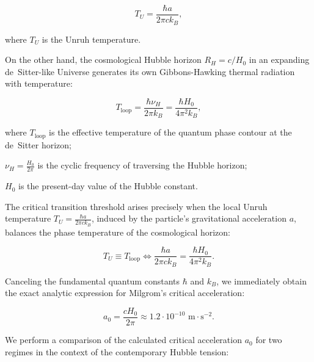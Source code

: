 \begin{equation}\label{eq:4.3}\tag{4.3}
T_U = \frac{\hbar a}{2\pi c k_B},
\end{equation}

where $T_U$ is the Unruh temperature.

On the other hand, the cosmological Hubble horizon $R_H = c/H_0$ in an expanding de~Sitter-like Universe generates its own Gibbons-Hawking thermal radiation \cite{ref25} with temperature:

\begin{equation}\label{eq:4.4}\tag{4.4}
T_{\text{loop}} = \frac{\hbar \nu_H}{2\pi k_B} = \frac{\hbar H_0}{4\pi^2 k_B},
\end{equation}

where $T_{\text{loop}}$ is the effective temperature of the quantum phase contour at the de~Sitter horizon;  

$\nu_H = \frac{H_0}{2\pi}$ is the cyclic frequency of traversing the Hubble horizon;  

$H_0$ is the present-day value of the Hubble constant.

The critical transition threshold arises precisely when the local Unruh temperature $T_U = \frac{\hbar a}{2\pi c k_B}$, induced by the particle's gravitational acceleration $a$, balances the phase temperature of the cosmological horizon:

\begin{equation}\label{eq:4.5}\tag{4.5}
T_U \equiv T_{\text{loop}} \iff \frac{\hbar a}{2\pi c k_B} = \frac{\hbar H_0}{4\pi^2 k_B}.
\end{equation}

Canceling the fundamental quantum constants $\hbar$ and $k_B$, we immediately obtain the exact analytic expression for Milgrom's critical acceleration:

\begin{equation}\label{eq:4.6}\tag{4.6}
a_0 = \frac{c H_0}{2\pi} \approx 1.2 \cdot 10^{-10}\text{ m}\cdot\text{s}^{-2}.
\end{equation}

We perform a comparison of the calculated critical acceleration $a_0$ for two regimes in the context of the contemporary Hubble tension:


